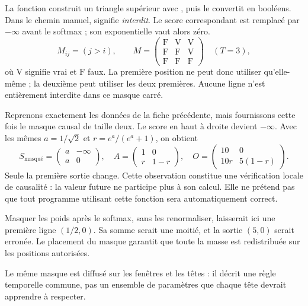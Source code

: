 La fonction  construit un triangle supérieur avec , puis le convertit en booléens. Dans le chemin manuel,  signifie \emph{interdit}. Le score correspondant est remplacé par $-\infty$ avant le softmax ; son exponentielle vaut alors zéro.
\[
 M_{ij}=(j>i),\qquad
 M=\begin{pmatrix}
 \mathrm{F}&\mathrm{V}&\mathrm{V}\\
 \mathrm{F}&\mathrm{F}&\mathrm{V}\\
 \mathrm{F}&\mathrm{F}&\mathrm{F}
 \end{pmatrix}
 \quad(T=3),
\]
où $\mathrm{V}$ signifie vrai et $\mathrm{F}$ faux. La première position ne peut donc utiliser qu'elle-même ; la deuxième peut utiliser les deux premières. Aucune ligne n'est entièrement interdite dans ce masque carré.

Reprenons exactement les données de la fiche précédente, mais fournissons cette fois le masque causal de taille deux. Le score en haut à droite devient $-\infty$. Avec les mêmes $a=1/\sqrt2$ et $r=e^a/(e^a+1)$, on obtient
\[
 S_{\text{masqué}}=\begin{pmatrix}a&-\infty\\a&0\end{pmatrix},
 \quad A=\begin{pmatrix}1&0\\r&1-r\end{pmatrix},
 \quad O=\begin{pmatrix}10&0\\10r&5(1-r)\end{pmatrix}.
\]
Seule la première sortie change. Cette observation constitue une vérification locale de causalité : la valeur future ne participe plus à son calcul. Elle ne prétend pas que tout programme utilisant cette fonction sera automatiquement correct.

Masquer les poids après le softmax, sans les renormaliser, laisserait ici une première ligne $(1/2,0)$. Sa somme serait une moitié, et la sortie $(5,0)$ serait erronée. Le placement du masque garantit que toute la masse est redistribuée sur les positions autorisées.

Le même masque est diffusé sur les fenêtres et les têtes : il décrit une règle temporelle commune, pas un ensemble de paramètres que chaque tête devrait apprendre à respecter.


